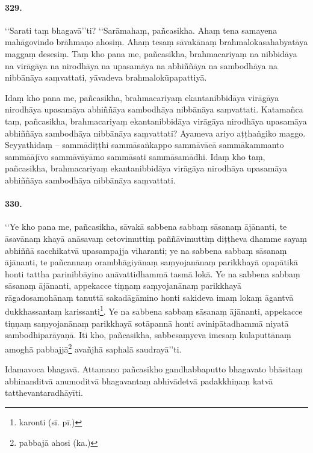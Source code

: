 \paragraph{329.} ‘‘Sarati taṃ bhagavā’’ti? ‘‘Sarāmahaṃ, pañcasikha. Ahaṃ tena samayena mahāgovindo brāhmaṇo ahosiṃ. Ahaṃ tesaṃ sāvakānaṃ brahmalokasahabyatāya maggaṃ desesiṃ. Taṃ kho pana me, pañcasikha, brahmacariyaṃ na nibbidāya na virāgāya na nirodhāya na upasamāya na abhiññāya na sambodhāya na nibbānāya saṃvattati, yāvadeva brahmalokūpapattiyā.

Idaṃ kho pana me, pañcasikha, brahmacariyaṃ ekantanibbidāya virāgāya nirodhāya upasamāya abhiññāya sambodhāya nibbānāya saṃvattati. Katamañca taṃ, pañcasikha, brahmacariyaṃ ekantanibbidāya virāgāya nirodhāya upasamāya abhiññāya sambodhāya nibbānāya saṃvattati? Ayameva ariyo aṭṭhaṅgiko maggo. Seyyathidaṃ – sammādiṭṭhi sammāsaṅkappo sammāvācā sammākammanto sammāājīvo sammāvāyāmo sammāsati sammāsamādhi. Idaṃ kho taṃ, pañcasikha, brahmacariyaṃ ekantanibbidāya virāgāya nirodhāya upasamāya abhiññāya sambodhāya nibbānāya saṃvattati.

\paragraph{330.} ‘‘Ye kho pana me, pañcasikha, sāvakā sabbena sabbaṃ sāsanaṃ ājānanti, te āsavānaṃ khayā anāsavaṃ cetovimuttiṃ paññāvimuttiṃ diṭṭheva dhamme sayaṃ abhiññā sacchikatvā upasampajja viharanti; ye na sabbena sabbaṃ sāsanaṃ ājānanti, te pañcannaṃ orambhāgiyānaṃ saṃyojanānaṃ parikkhayā opapātikā honti tattha parinibbāyino anāvattidhammā tasmā lokā. Ye na sabbena sabbaṃ sāsanaṃ ājānanti, appekacce tiṇṇaṃ saṃyojanānaṃ parikkhayā rāgadosamohānaṃ tanuttā sakadāgāmino honti sakideva imaṃ lokaṃ āgantvā dukkhassantaṃ karissanti\footnote{karonti (sī. pī.)}. Ye na sabbena sabbaṃ sāsanaṃ ājānanti, appekacce tiṇṇaṃ saṃyojanānaṃ parikkhayā sotāpannā honti avinipātadhammā niyatā sambodhiparāyaṇā. Iti kho, pañcasikha, sabbesaṃyeva imesaṃ kulaputtānaṃ amoghā pabbajjā\footnote{pabbajā ahosi (ka.)} avañjhā saphalā saudrayā’’ti.

Idamavoca bhagavā. Attamano pañcasikho gandhabbaputto bhagavato bhāsitaṃ abhinanditvā anumoditvā bhagavantaṃ abhivādetvā padakkhiṇaṃ katvā tatthevantaradhāyīti.

